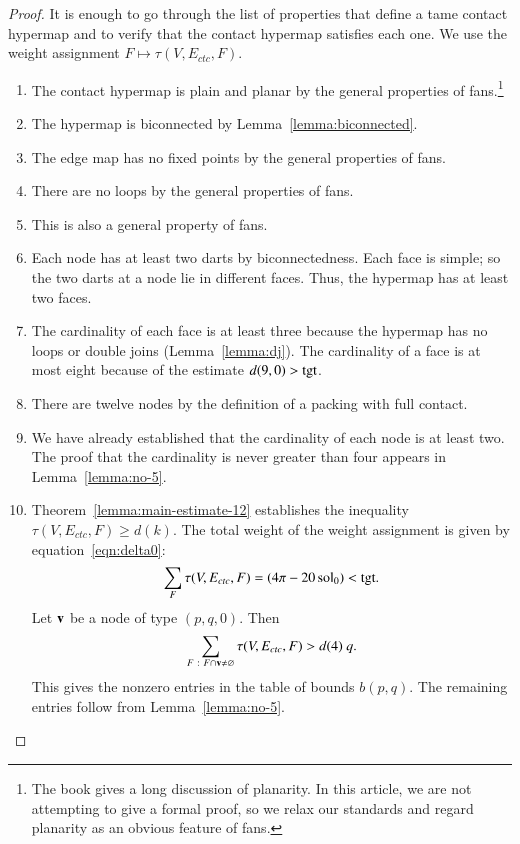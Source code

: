 \documentclass{llncs}
\def\op#1{{\hbox{#1}}}
\begin{document}
\begin{proof} It is enough to go through the list of properties that
  define a tame contact hypermap and to verify that the contact
  hypermap satisfies each one.  We use the weight assignment $F\mapsto
  \tau(V,E_{ctc},F)$.

\begin{enumerate}
\item {} The contact hypermap is plain and planar by the
  general properties of fans.\footnote{The book \cite{dsp} gives a long
    discussion of planarity.  In this article, we are not attempting
    to give a formal proof, so we relax our standards and
    regard planarity as an obvious feature of fans.}
\item {} The hypermap is biconnected by
  Lemma~\ref{lemma:biconnected}.
\item {} The
  edge map has no fixed points by the general properties of fans.
\item {} 
  There are no loops by the general properties of
  fans.
\item {} This is also a general property of fans.
\item {} Each node has at least two darts by
  biconnectedness. Each face is simple; so the two darts at a node lie
  in different faces.  Thus, the hypermap has at least two faces.
\item {} The cardinality of each face is at least three
  because the hypermap has no loops or double joins (Lemma~\ref{lemma:dj}).
  The cardinality of a face is at most eight because of the estimate
  $d(9,0)>\op{tgt}$.
\item {} There are twelve nodes by the definition of a
  packing with full contact.
\item {} We have already established that the cardinality
  of each node is at least two.  The proof that the cardinality is
  never  greater than four appears in Lemma~\ref{lemma:no-5}.
\item {} Theorem~\ref{lemma:main-estimate-12} establishes 
 the inequality $\tau(V,E_{ctc},F)\ge d(k)$.
  The total weight of the weight assignment is given by
  equation~\eqref{eqn:delta0}:
\[
  \sum_F \tau(V,E_{ctc},F) = (4\pi - 20\sol_0) < \op{tgt}.
\]
%
Let ${\mathbf v}$ be a node of type $(p,q,0)$.  
Then
\[
\sum_{F\ :\  F\cap {\mathbf v}\ne\varnothing}\tau(V,E_{ctc},F) > d(4)~q.
\]
This gives the nonzero entries in the table of bounds $b(p,q)$.  The
remaining entries follow from Lemma~\ref{lemma:no-5}.
\end{enumerate}
\end{proof}
\end{document}
